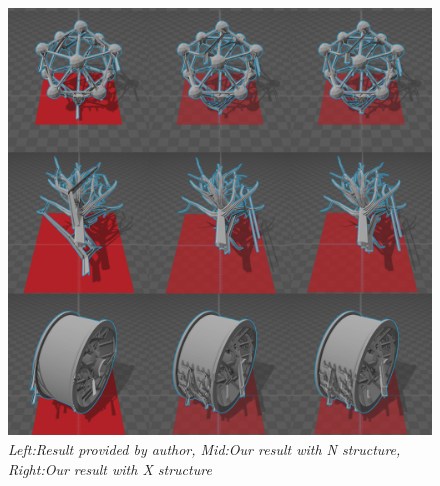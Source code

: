 \documentclass[11pt, a4paper]{article}
\begin{document}
\begin{appendix}
\begin{figure}[!ht]
      	\includegraphics[width=\textwidth]{totalp2.png}
  	\caption{\textit{Left:Result provided by author, Mid:Our result with N structure, Right:Our result with X structure}}
	\end{figure}
	\end{appendix}
\end{document}
